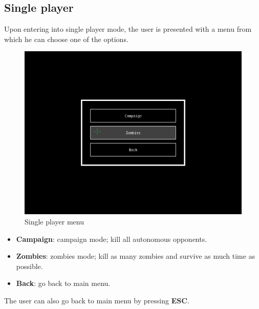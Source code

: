 \documentclass{article}
\theoremstyle{remark}
\begin{document}
\subsection{Single player}
Upon entering into single player mode, the user is presented with a menu from which he can choose one of the options. \par
\begin{figure}[H] \centering
	\includegraphics[scale=0.45]{singleplayer01}
	\caption{Single player menu}
\end{figure}
\begin{itemize}
	\item \textbf{Campaign}: campaign mode; kill all autonomous opponents.
	\item \textbf{Zombies}: zombies mode; kill as many zombies and survive as much time as possible.
	\item \textbf{Back}: go back to main menu.
\end{itemize}
The user can also go back to main menu by pressing \textbf{ESC}.
\pagebreak
\end{document}
